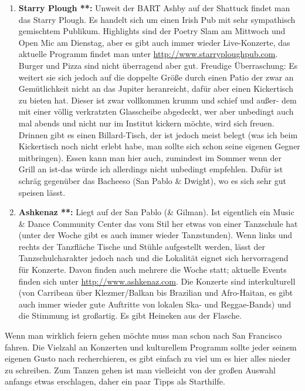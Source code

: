 \documentclass[a4paper]{scrreprt}
\begin{document}
\begin{enumerate}
  \item \textbf{Starry Plough **:} Unweit der BART Ashby auf der Shattuck findet man das Starry Plough. Es handelt sich um einen Irish Pub mit sehr sympathisch gemischtem Publikum. Highlights sind der Poetry Slam am Mittwoch und Open Mic am Dienstag, aber es gibt auch immer wieder Live-Konzerte, das aktuelle Programm findet man unter \url{http://www.starryploughpub.com}. Burger und Pizza sind nicht überragend aber gut. Freudige Überraschung: Es weitert sie sich jedoch auf die doppelte Größe durch einen Patio der zwar an Gemütlichkeit nicht an das Jupiter heranreicht, dafür aber einen Kickertisch zu bieten hat. Dieser ist zwar vollkommen krumm und schief und außer- dem mit einer völlig verkratzten Glasscheibe abgedeckt, wer aber unbedingt auch mal abends und nicht nur im Institut kickern möchte, wird sich freuen. Drinnen gibt es einen Billard-Tisch, der ist jedoch meist belegt (was ich beim Kickertisch noch nicht erlebt habe, man sollte sich schon seine eigenen Gegner mitbringen). Essen kann man hier auch, zumindest im Sommer wenn der Grill an ist-das würde ich allerdings nicht unbedingt empfehlen. Dafür ist schräg gegenüber das Bacheeso (San Pablo \& Dwight), wo es sich sehr gut speisen lässt.
  
  \item \textbf{Ashkenaz **:} Liegt auf der San Pablo (\& Gilman). Ist eigentlich ein Music \& Dance Community Center das vom Stil her etwas von einer Tanzschule hat (unter der Woche gibt es auch immer wieder Tanzstunden). Wenn links und rechts der Tanzfläche Tische und Stühle aufgestellt werden, lässt der Tanzschulcharakter jedoch nach und die Lokalität eignet sich hervorragend für Konzerte. Davon finden auch mehrere die Woche statt; aktuelle Events finden sich unter \url{http://www.ashkenaz.com}. Die Konzerte sind interkulturell (von Carribean über Klezmer/Balkan bis Brazilian und Afro-Haitan, es gibt auch immer wieder gute Auftritte von lokalen Ska- und Reggae-Bands) und die Stimmung ist großartig. Es gibt Heineken aus der Flasche.

\end{enumerate}
  
Wenn man wirklich feiern gehen möchte muss man schon nach San Francisco fahren. Die Vielzahl an Konzerten und kulturellem Programm sollte jeder seinem eigenen Gusto nach recherchieren, es gibt einfach zu viel um es hier alles nieder zu schreiben. Zum Tanzen gehen ist man vielleicht von der großen Auswahl anfangs etwas erschlagen, daher ein paar Tipps als Starthilfe.
\end{document}
